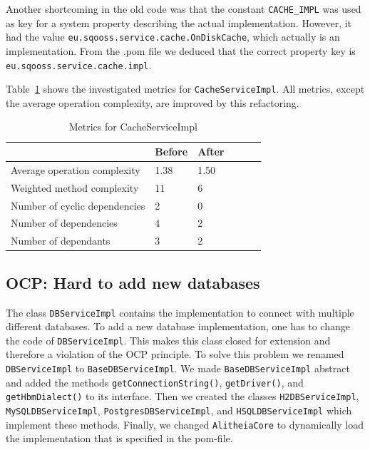\documentclass{article}
\begin{document}
Another shortcoming in the old code was that the constant \verb|CACHE_IMPL| was used as key for a system property describing the actual implementation. However, it had the value \texttt{eu\allowbreak.sqooss.service.cache.OnDiskCache}, which actually is an implementation. From the .pom file we deduced that the correct property key is \verb|eu.sqooss.service.cache.impl|.

Table~\ref{tbl:cacheserviceimpl} shows the investigated metrics for \verb|CacheServiceImpl|. All metrics, except the average operation complexity, are improved by this refactoring.

\begin{table}[h]
	\centering
    \begin{tabular}{l|llll}
    ~                                 & Before & After & ~ & ~ \\ \hline
    Average operation complexity      & 1.38 & 1.50 \\
    Weighted method complexity        & 11   & 6 \\
    Number of cyclic dependencies     & 2    & 0 \\
    Number of dependencies            & 4    & 2 \\
    Number of dependants              & 3    & 2 \\
    \end{tabular}
    \caption{Metrics for CacheServiceImpl}
    \label{tbl:cacheserviceimpl}
\end{table}

\subsection{OCP: Hard to add new databases}
The class \verb|DBServiceImpl| contains the implementation to connect with multiple different databases. To add a new database implementation, one has to change the code of \verb|DBServiceImpl|. This makes this class closed for extension and therefore a violation of the OCP principle.
To solve this problem we renamed \verb|DBServiceImpl| to \verb|BaseDBServiceImpl|. We made \verb|BaseDBServiceImpl| abstract and added the methods \verb|getConnectionString()|, \verb|getDriver()|, and \verb|getHbmDialect()| to its interface. Then we created the classes \verb|H2DBServiceImpl|, \verb|MySQLDBServiceImpl|, \verb|PostgresDBServiceImpl|, and \verb|HSQLDBServiceImpl| which implement these methods. Finally, we changed \verb|AlitheiaCore| to dynamically load the implementation that is specified in the pom-file.
\end{document}
